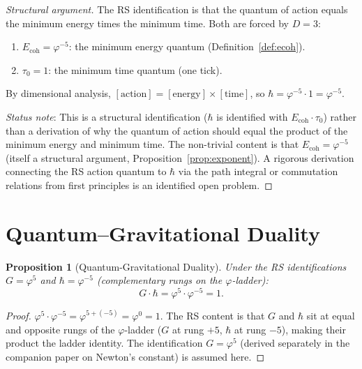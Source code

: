 \documentclass[12pt,a4paper]{article}
\newtheorem{proposition}[theorem]{Proposition}
\theoremstyle{definition}
\theoremstyle{remark}
\begin{document}
\begin{proof}[Structural argument]
The RS identification is that the quantum of action equals the minimum
energy times the minimum time.  Both are forced by $D = 3$:
\begin{enumerate}[label=(\roman*),nosep]
  \item $E_{\mathrm{coh}} = \varphi^{-5}$: the minimum energy
  quantum (Definition~\ref{def:ecoh}).
  \item $\tau_0 = 1$: the minimum time quantum (one tick).
\end{enumerate}
By dimensional analysis, $[\text{action}] = [\text{energy}] \times [\text{time}]$,
so $\hbar = \varphi^{-5} \cdot 1 = \varphi^{-5}$.

\emph{Status note}: This is a structural identification ($\hbar$ is
identified with $E_\mathrm{coh} \cdot \tau_0$) rather than a
derivation of why the quantum of action should equal the product of
the minimum energy and minimum time.  The non-trivial content is
that $E_\mathrm{coh} = \varphi^{-5}$ (itself a structural argument,
Proposition~\ref{prop:exponent}).  A rigorous derivation connecting
the RS action quantum to $\hbar$ via the path integral or commutation
relations from first principles is an identified open problem.
\end{proof}

\section{Quantum--Gravitational Duality}
\label{sec:duality}

\begin{proposition}[Quantum-Gravitational Duality]
\label{thm:duality}
Under the RS identifications $G = \varphi^5$ and $\hbar = \varphi^{-5}$
(complementary rungs on the $\varphi$-ladder):
\begin{equation}
  \boxed{G \cdot \hbar = \varphi^5 \cdot \varphi^{-5} = 1.}
\end{equation}
\end{proposition}

\begin{proof}
$\varphi^{5} \cdot \varphi^{-5} = \varphi^{5+(-5)} = \varphi^0 = 1$.
The RS content is that $G$ and $\hbar$ sit at equal and opposite rungs
of the $\varphi$-ladder ($G$ at rung $+5$, $\hbar$ at rung $-5$),
making their product the ladder identity.  The identification
$G = \varphi^5$ (derived separately in the companion paper on Newton's
constant) is assumed here.
\end{proof}
\end{document}
